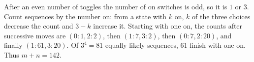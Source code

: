 After an even number of toggles the number of on switches is odd, so it is $1$ or $3$. Count sequences by the number on: from a state with $k$ on, $k$ of the three choices decrease the count and $3-k$ increase it. Starting with one on, the counts after successive moves are $(0:1,2:2)$, then $(1:7,3:2)$, then $(0:7,2:20)$, and finally $(1:61,3:20)$. Of $3^4=81$ equally likely sequences, $61$ finish with one on. Thus $m+n=\boxed{142}$.
